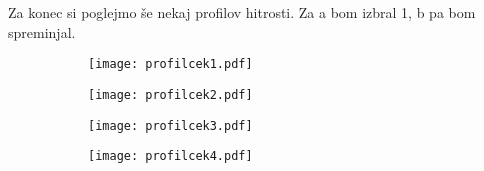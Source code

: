 \documentclass{article}
\begin{document}
Za konec si poglejmo še nekaj profilov hitrosti. Za a bom izbral 1, b pa bom spreminjal.

\begin{figure}[H]
\begin{subfigure}{.5\textwidth}
\texttt{[image: profilcek1.pdf]}
\end{subfigure}
\begin{subfigure}{.5\textwidth}
\texttt{[image: profilcek2.pdf]}
\end{subfigure}
\end{figure}

\begin{figure}[H]
\begin{subfigure}{.5\textwidth}
\texttt{[image: profilcek3.pdf]}
\end{subfigure}
\begin{subfigure}{.5\textwidth}
\texttt{[image: profilcek4.pdf]}
\end{subfigure}
\end{figure}
\end{document}
